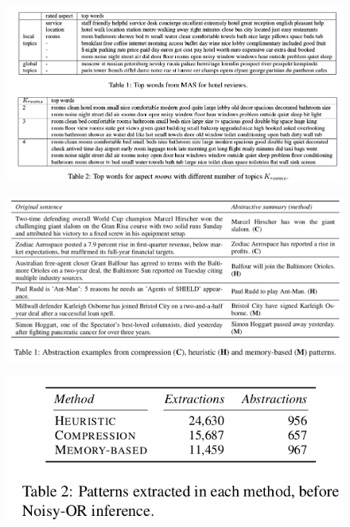 \documentclass[xcolor={table}]{beamer}
\begin{document}
\begin{frame}{\cite{titov2008joint}}
\begin{figure}[h]
\centering
\includegraphics[scale=.3]{images/table1-2-titov08} \\
\end{figure}
\end{frame}

\begin{frame}{\cite{pighin2014modelling}}
\begin{figure}[h]
\centering
\includegraphics[scale=.2]{images/table1-pighin14} \\
\end{figure}
\end{frame}

\begin{frame}{\cite{pighin2014modelling}}
\begin{figure}[h]
\centering
\includegraphics[scale=.3]{images/table2-pighin14} \\
\end{figure}
\end{frame}
\end{document}
